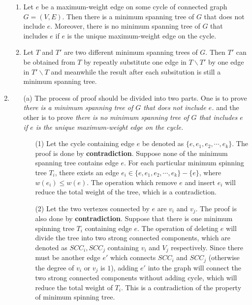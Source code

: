 \documentclass[12pt,a4paper]{article}
\makeatletter
\newtheorem*{solution}{Solution}
\theoremstyle{definition}
\renewenvironment{solution}[1][Solution] {\par\pushQED{\qed}\normalfont\topsep6\p@\@plus6\p@\relax\trivlist\item[\hskip\labelsep\bfseries#1\@addpunct{.}]\ignorespaces}{\popQED\endtrivlist\@endpefalse} \makeatother
\makeatother
\begin{document}
\begin{enumerate}
	\begin{enumerate}
		\item Let $e$ be a maximum-weight edge on some cycle of connected graph $G=(V,E)$.
        Then there is a minimum spanning tree of $G$ that does not include $e$. Moreover, there is no minimum spanning tree of $G$ that includes $e$ if $e$ is the unique maximum-weight edge on the cycle. 
		\item Let $T$ and $T'$ are two different minimum spanning trees of $G$. Then $T'$ can be obtained from $T$ by repeatly substitute one edge in $T\backslash T'$ by one edge in $T'\backslash T$ and meanwhile the result after each subsitution is still a minimum spanning tree.
	\end{enumerate}
	\begin{solution}
	\begin{enumerate}
	    \item [(a)] The process of proof should be divided into two parts. One is to prove \textit{there is a minimum spanning tree of $G$ that does not include $e$.} and the other is to prove \textit{there is no minimum spanning tree of $G$ that includes $e$ if $e$ is the unique maximum-weight edge on the cycle.}
	    \\
	    \begin{enumerate}
	        \item [(1)] Let the cycle containing edge $e$ be denoted as $\{e,e_1,e_2,\cdots,e_k\}$. The proof is done by \textbf{contradiction}. Suppose none of the minimum spanning tree contains edge $e$. For each particular minimum spinning tree $T_i$, there exists an edge $e_i\in \{e,e_1,e_2,\cdots,e_k\}-\{e \}$, where $w(e_i)\leq w(e)$. The operation which remove $e$ and insert $e_i$ will reduce the total weight of the tree, which is a contradiction. 
	        \item [(2)] Let the two vertexes connected by $e$ are $v_i$ and $v_j$. The proof is also done by \textbf{contradiction}. Suppose that there is one minimum spinning tree $T_i$ containing edge $e$. The operation of deleting $e$ will divide the tree into two strong connected components, which are denoted as $SCC_i,SCC_j$ containing $v_i$ and $V_j$ respectively. Since there must be another edge $e'$ which connects $SCC_i$ and $SCC_j$ (otherwise the degree of $v_i$ or $v_j$ is $1$), adding $e'$ into the graph will connect the two strong connected components without adding cycle, which will reduce the total weight of $T_i$. This is a contradiction of the property of minimum spinning tree.
	    \end{enumerate}
	   

\end{enumerate}
\end{solution}
\end{enumerate}
\end{document}
